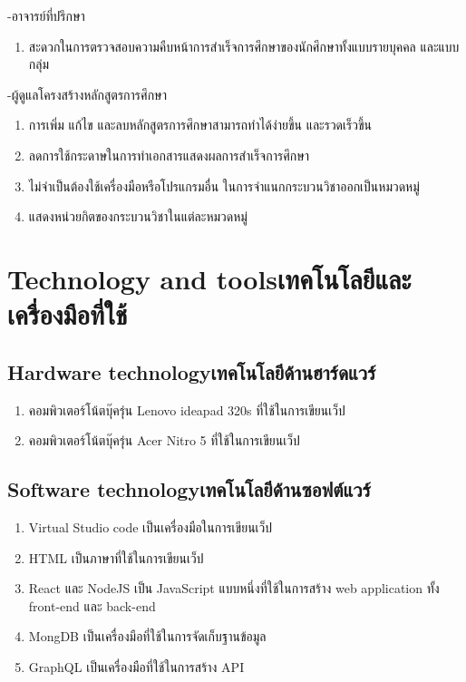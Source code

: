 -อาจารย์ที่ปรึกษา 

\begin{enumerate}
    \item สะดวกในการตรวจสอบความคืบหน้าการสำเร็จการศึกษาของนักศึกษาทั้งแบบรายบุคคล และแบบกลุ่ม 
\end{enumerate}

-ผู้ดูแลโครงสร้างหลักสูตรการศึกษา

\begin{enumerate}
    \item การเพิ่ม แก้ไข และลบหลักสูตรการศึกษาสามารถทำได้ง่ายขึ้น  และรวดเร็วขึ้น
    \item ลดการใช้กระดาษในการทำเอกสารแสดงผลการสำเร็จการศึกษา 
    \item ไม่จำเป็นต้องใช้เครื่องมือหรือโปรแกรมอื่น ในการจำแนกกระบวนวิชาออกเป็นหมวดหมู่ 
    \item แสดงหน่วยกิตของกระบวนวิชาในแต่ละหมวดหมู่
    
\end{enumerate}

\section{\ifenglish Technology and tools\else เทคโนโลยีและเครื่องมือที่ใช้\fi}

\subsection{\ifenglish Hardware technology\else เทคโนโลยีด้านฮาร์ดแวร์\fi}

\begin{enumerate}
    \item คอมพิวเตอร์โน้ตบุ๊ครุ่น Lenovo ideapad 320s ที่ใช้ในการเขียนเว็ป
    \item คอมพิวเตอร์โน้ตบุ๊ครุ่น Acer Nitro 5  ที่ใช้ในการเขียนเว็ป
\end{enumerate}

\subsection{\ifenglish Software technology\else เทคโนโลยีด้านซอฟต์แวร์\fi}

\begin{enumerate}
    \item Virtual Studio code เป็นเครื่องมือในการเขียนเว็ป
    \item HTML เป็นภาษาที่ใช้ในการเขียนเว็ป
    \item React และ NodeJS เป็น JavaScript แบบหนึ่งที่ใช้ในการสร้าง web application ทั้ง front-end และ back-end  
    \item MongDB เป็นเครื่องมือที่ใช้ในการจัดเก็บฐานข้อมูล
    \item GraphQL เป็นเครื่องมือที่ใช้ในการสร้าง API 
\end{enumerate}


